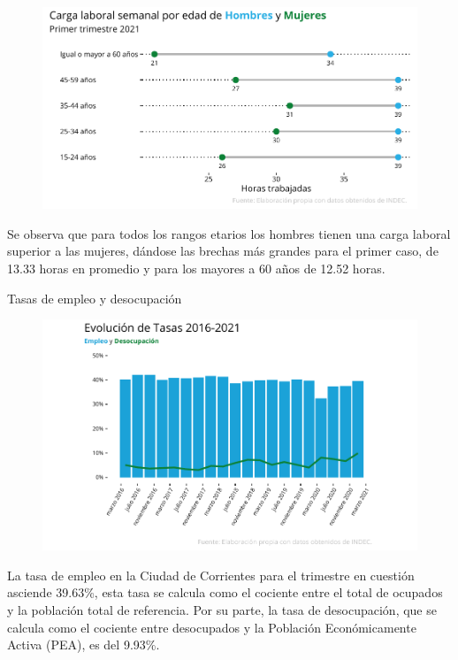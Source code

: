 \documentclass{article}
\begin{document}
\begin{figure}
\includegraphics{Informe-Mercado-Laboral_files/figure-latex/unnamed-chunk-20-1.pdf}
\caption{} 
\end{figure}

\newpage
Se observa que para todos los rangos etarios los hombres tienen una
carga laboral superior a las mujeres, dándose las brechas más grandes
para el primer caso, de 13.33 horas en promedio y para los mayores a 60
años de 12.52 horas.

\newpage

\textcolor{graycustom}{\Large Tasas de empleo y desocupación} \newline
\begin{figure}
\includegraphics{Informe-Mercado-Laboral_files/figure-latex/unnamed-chunk-23-1.pdf}
\caption{} 
\end{figure}


La tasa de empleo en la Ciudad de Corrientes para el
trimestre en cuestión asciende 39.63\%, esta tasa se calcula como el
cociente entre el total de ocupados y la población total de referencia.
Por su parte, la tasa de desocupación, que se calcula como el cociente
entre desocupados y la Población Económicamente Activa (PEA), es del
9.93\%.
\end{document}
